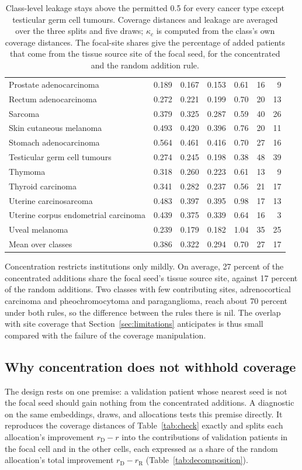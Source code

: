 \begin{table}[htbp]
\begin{tabular}{@{}lrrrrrr@{}}
Prostate adenocarcinoma & 0.189 & 0.167 & 0.153 & 0.61 & 16 & 9 \\
Rectum adenocarcinoma & 0.272 & 0.221 & 0.199 & 0.70 & 20 & 13 \\
Sarcoma & 0.379 & 0.325 & 0.287 & 0.59 & 40 & 26 \\
Skin cutaneous melanoma & 0.493 & 0.420 & 0.396 & 0.76 & 20 & 11 \\
Stomach adenocarcinoma & 0.564 & 0.461 & 0.416 & 0.70 & 27 & 16 \\
Testicular germ cell tumours & 0.274 & 0.245 & 0.198 & 0.38 & 48 & 39 \\
Thymoma & 0.318 & 0.260 & 0.223 & 0.61 & 13 & 9 \\
Thyroid carcinoma & 0.341 & 0.282 & 0.237 & 0.56 & 21 & 17 \\
Uterine carcinosarcoma & 0.483 & 0.397 & 0.395 & 0.98 & 17 & 13 \\
Uterine corpus endometrial carcinoma & 0.439 & 0.375 & 0.339 & 0.64 & 16 & 3 \\
Uveal melanoma & 0.239 & 0.179 & 0.182 & 1.04 & 35 & 25 \\
\midrule
Mean over classes & 0.386 & 0.322 & 0.294 & 0.70 & 27 & 17 \\
\bottomrule
\end{tabular}
\caption{Class-level leakage stays above the permitted 0.5 for every cancer type except testicular germ cell tumours. Coverage distances and leakage are averaged over the three splits and five draws; $\kappa_c$ is computed from the class's own coverage distances. The focal-site shares give the percentage of added patients that come from the tissue source site of the focal seed, for the concentrated and the random addition rule.}
\label{tab:class-check}
\end{table}

Concentration restricts institutions only mildly. On average, 27 percent of the concentrated additions share the focal seed's tissue source site, against 17 percent of the random additions. Two classes with few contributing sites, adrenocortical carcinoma and pheochromocytoma and paraganglioma, reach about 70 percent under both rules, so the difference between the rules there is nil. The overlap with site coverage that Section~\ref{sec:limitations} anticipates is thus small compared with the failure of the coverage manipulation.

\subsection{Why concentration does not withhold coverage}
\label{sec:diagnosis}
The design rests on one premise: a validation patient whose nearest seed is not the focal seed should gain nothing from the concentrated additions. A diagnostic on the same embeddings, draws, and allocations tests this premise directly. It reproduces the coverage distances of Table~\ref{tab:check} exactly and splits each allocation's improvement $r_{\mathrm D}-r$ into the contributions of validation patients in the focal cell and in the other cells, each expressed as a share of the random allocation's total improvement $r_{\mathrm D}-r_{\mathrm R}$ (Table~\ref{tab:decomposition}).

